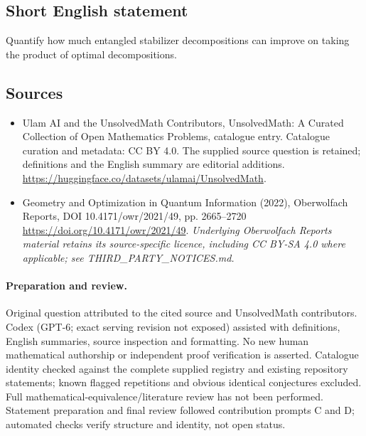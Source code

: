 \documentclass[11pt]{article}
\begin{document}
\subsection{Short English statement}
Quantify how much entangled stabilizer decompositions can improve on taking the product of optimal decompositions.
\subsection{Sources}
\begin{itemize}
\item[\hypertarget{source:statement:1}{S1}] Ulam AI and the UnsolvedMath Contributors, UnsolvedMath: A Curated Collection of Open Mathematics Problems, catalogue entry. Catalogue curation and metadata: CC BY 4.0. The supplied source question is retained; definitions and the English summary are editorial additions.
\url{https://huggingface.co/datasets/ulamai/UnsolvedMath}.
\item[\hypertarget{source:statement:2}{S2}] Geometry and Optimization in Quantum Information (2022), Oberwolfach Reports, DOI 10.4171/owr/2021/49, pp. 2665--2720
\url{https://doi.org/10.4171/owr/2021/49}.
\textit{Underlying Oberwolfach Reports material retains its source-specific licence, including CC BY-SA 4.0 where applicable; see THIRD\_PARTY\_NOTICES.md.}
\end{itemize}
\paragraph{Preparation and review.}
Original question attributed to the cited source and UnsolvedMath contributors. Codex (GPT-6; exact serving revision not exposed) assisted with definitions, English summaries, source inspection and formatting. No new human mathematical authorship or independent proof verification is asserted. Catalogue identity checked against the complete supplied registry and existing repository statements; known flagged repetitions and obvious identical conjectures excluded. Full mathematical-equivalence/literature review has not been performed. Statement preparation and final review followed contribution prompts C and D; automated checks verify structure and identity, not open status.
\label{end:statement}
\end{document}
